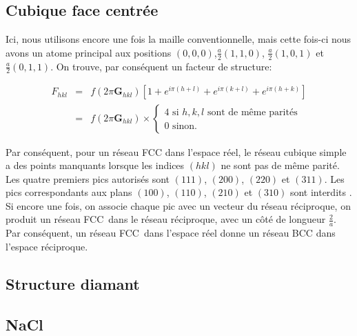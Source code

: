 \subsection{Cubique face centrée}

Ici, nous utilisons encore une fois la maille conventionnelle, mais cette fois-ci
nous avons un atome principal aux positions $(0,0,0)$,$\frac{a}{2}(1,1,0)$,
$\frac{a}{2}(1,0,1)$ et $\frac{a}{2}(0,1,1)$. On trouve, par conséquent un
facteur de structure:

\begin{eqnarray}
    F_{hkl} & = & f(2\pi \mathbf{G}_{hkl}) [ 1 + e^{i\pi(h+l)} + e^{i\pi(k+l)} + e^{i\pi(h+k)}]\\
    & = & f(2\pi\mathbf{G}_{hkl}) \times \begin{cases} 4 \text{ si } h,k,l \text{ sont de même parités}\\
    0\text{ sinon.} \end{cases}
\end{eqnarray}

Par conséquent, pour un réseau FCC dans l'espace réel, le réseau cubique simple a
des points manquants lorsque les indices $(hkl)$ ne sont pas de même parité. Les
quatre premiers pics autorisés sont $(111)$, $(200)$, $(220)$ et $(311)$. Les
pics correspondants aux plans $(100)$, $(110)$, $(210)$ et $(310)$ sont interdits
. Si encore une fois, on associe chaque pic avec un vecteur du réseau réciproque,
on produit un réseau FCC dans le réseau réciproque, avec un côté de longueur
$\frac{2}{a}$. Par conséquent, un réseau FCC dans l'espace réel donne un réseau
BCC dans l'espace réciproque.



\subsection{Structure diamant}
\subsection{NaCl}
